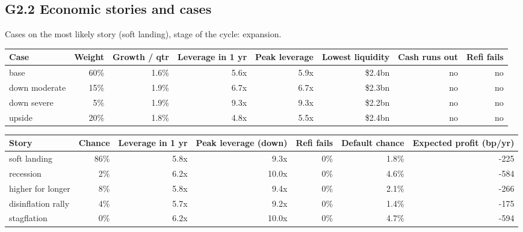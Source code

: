 \documentclass[11pt,a4paper]{article}
\begin{document}
\subsection*{G2.2 Economic stories and cases}
Cases on the most likely story (soft landing), stage of the cycle: expansion.
\begin{center}\scriptsize\setlength{\tabcolsep}{3.5pt}\begin{tabular}{@{}lrrrrrrr@{}}\toprule
Case & Weight & Growth / qtr & Leverage in 1 yr & Peak leverage & Lowest liquidity & Cash runs out & Refi fails \\\midrule
base & 60\% & 1.6\% & 5.6x & 5.9x & \$2.4bn & no & no \\
down moderate & 15\% & 1.9\% & 6.7x & 6.7x & \$2.3bn & no & no \\
down severe & 5\% & 1.9\% & 9.3x & 9.3x & \$2.2bn & no & no \\
upside & 20\% & 1.8\% & 4.8x & 5.5x & \$2.4bn & no & no \\
\bottomrule\end{tabular}\end{center}
\begin{center}\scriptsize\setlength{\tabcolsep}{3.5pt}\begin{tabular}{@{}lrrrrrr@{}}\toprule
Story & Chance & Leverage in 1 yr & Peak leverage (down) & Refi fails & Default chance & Expected profit (bp/yr) \\\midrule
soft landing & 86\% & 5.8x & 9.3x & 0\% & 1.8\% & -225 \\
recession & 2\% & 6.2x & 10.0x & 0\% & 4.6\% & -584 \\
higher for longer & 8\% & 5.8x & 9.4x & 0\% & 2.1\% & -266 \\
disinflation rally & 4\% & 5.7x & 9.2x & 0\% & 1.4\% & -175 \\
stagflation & 0\% & 6.2x & 10.0x & 0\% & 4.7\% & -594 \\
\bottomrule\end{tabular}\end{center}
\end{document}
